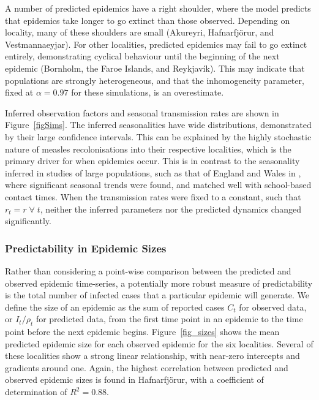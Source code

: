 \documentclass[10pt]{article}
\begin{document}
A number of predicted epidemics have a right shoulder, where the model predicts that epidemics take longer to go extinct than those observed. Depending on locality, many of these shoulders are small (Akureyri, Hafnarfj\"{o}r\dh{}ur, and Vestmannaeyjar). For other localities, predicted epidemics may fail to go extinct entirely, demonstrating cyclical behaviour until the beginning of the next epidemic (Bornholm, the Faroe Islands, and Reykjav\'{i}k). This may indicate that populations are strongly heterogeneous, and that the inhomogeneity parameter, fixed at $\alpha=0.97$ for these simulations, is an overestimate.

Inferred observation factors and seasonal transmission rates are shown in Figure~\ref{figSims}. The inferred seasonalities have wide distributions, demonstrated by their large confidence intervals. This can be explained by the highly stochastic nature of measles recolonisations into their respective localities, which is the primary driver for when epidemics occur. This is in contrast to the seasonality inferred in studies of large populations, such as that of England and Wales in \cite{Finkenstadt2000}, where significant seasonal trends were found, and matched well with school-based contact times. When the transmission rates were fixed to a constant, such that $r_t = r \; \forall \; t$, neither the inferred parameters nor the predicted dynamics changed significantly. 






\subsubsection*{Predictability in Epidemic Sizes}

Rather than considering a point-wise comparison between the predicted and observed epidemic time-series, a potentially more robust measure of predictability is the total number of infected cases that a particular epidemic will generate. We define the size of an epidemic as the sum of reported cases $C_t$ for observed data, or $I_t / \rho_t$ for predicted data, from the first time point in an epidemic to the time point before the next epidemic begins. Figure~\ref{fig_sizes} shows the mean predicted epidemic size for each observed epidemic for the six localities. Several of these localities show a strong linear relationship, with near-zero intercepts and gradients around one. Again, the highest correlation between predicted and observed epidemic sizes is found in Hafnarfj\"{o}r\dh{}ur, with a coefficient of determination of $R^2 = 0.88$.
\end{document}
